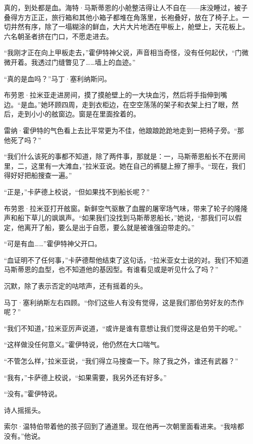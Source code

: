 \documentclass[AutoFakeBold=true]{book}
\begin{document}
\vspace*{1em}

真的，到处都是血。海特·马斯蒂恩的小舱整洁得让人不自在——床没睡过，被子叠得方方正正，旅行箱和其他小箱子都堆在角落里，长袍叠好，放在了椅子上。一切井然有序，除了一塌糊涂的鲜血，大片大片地洒在甲板上，舱壁上，天花板上。六名朝圣者挤在门口，不愿走进去。

``我刚才正在向上甲板走去，''霍伊特神父说，声音相当奇怪，没有任何起伏，``门微微开着。我透过门缝瞥见了……墙上的血迹。''

``真的是血吗？''马丁·塞利纳斯问。

布劳恩·拉米亚走进房间，摸了摸舱壁上的一大块血污，然后将手指伸到嘴边。``是血。''她环顾四周，走到衣柜边，在空空荡荡的架子和衣架上扫了眼，然后，走到小小的舷窗边。窗是在里面拴着的。

雷纳·霍伊特的气色看上去比平常更为不佳，他踉踉跄跄地走到一把椅子旁。``那他死了吗？''

``我们什么该死的事都不知道，除了两件事，那就是：一，马斯蒂恩船长不在房间里，二，这里有一大滩血，''拉米亚说。她在自己的裤腿上擦了擦手。``现在，我们得好好把船搜查一遍。''

``正是，''卡萨德上校说，``但如果找不到船长呢？''

布劳恩·拉米亚打开舷窗。新鲜空气驱散了血腥的屠宰场气味，带来了轮子的隆隆声和船下草儿的飒飒声。``如果我们没找到马斯蒂恩船长，''她说，``那我们可以假定，他离开了船，要么是出于自愿，要么就是被谁强迫带走的。''

``可是有{\kaishu 血}……''霍伊特神父开口。

``血证明不了任何事，''卡萨德帮他结束了这句话，``拉米亚女士说的对。我们不知道马斯蒂恩的血型，也不知道他的基因型。有谁看见或是听见{\kaishu 什么}了吗？''

沉默，除了表示否定的咕哝声，还有摇着的头。

马丁·塞利纳斯左右四顾。``你们这些人有没有觉得，这是我们那伯劳好友的杰作呢？''

``我们不知道，''拉米亚厉声说道，``或许是谁有意想让我们觉得这是伯劳干的呢。''

``这样做没任何意义。''霍伊特说，他仍然在大口喘气。

``不管怎么样，''拉米亚说，``我们得立马搜查一下。除了我之外，谁还有武器？''

``我有，''卡萨德上校说，``如果需要，我另外还有好多。''

``没有。''霍伊特说。

诗人摇摇头。

索尔·温特伯带着他的孩子回到了通道里。现在他再一次朝里面看进来。``我啥都没有。''他说。
\end{document}
